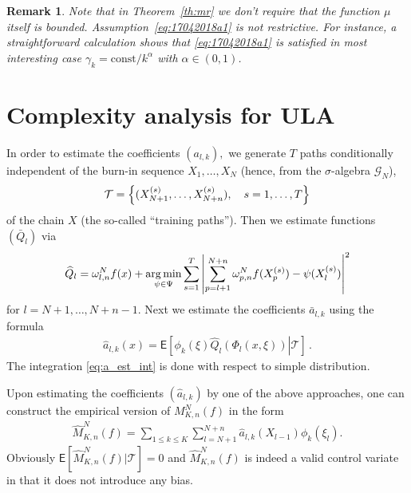 \documentclass[aap,preprint]{imsart}
\def\NtrainPath{T}
\def\TrainSet{\mathcal{T}}
\newtheorem{remark}{Remark}
\newcommand*{\argmin}{\operatornamewithlimits{arg\,min}}
\newcommand*{\const}{\mathrm{const}}
\begin{document}
\begin{remark}
Note that in  Theorem~\eqref{th:mr} we don't require that  the function \(\mu\) itself is bounded.
Assumption~\eqref{eq:17042018a1} is not restrictive.
For instance, a straightforward calculation shows
that \eqref{eq:17042018a1} is satisfied in most interesting case
$\gamma_k=\const/k^\alpha$ with $\alpha\in (0,1)$.
\end{remark}
\section{Complexity analysis for ULA}
\label{sec:coeff}
In order to estimate the coefficients \((a_{l,k}),\) we generate \(\NtrainPath\)  paths conditionally independent of the burn-in sequence $X_1,\dots,X_N$ (hence, from the $\sigma$-algebra $\mathcal{G}_N$),
\[
\TrainSet=\Bigl\{(X^{(s)}_{N+1},\ldots,X^{(s)}_{N+n}),\quad s=1,\ldots,\NtrainPath\Bigr\}
\]
of the chain \(X\)
(the so-called ``training paths'').
Then we estimate  functions \((\bar Q_{l})\) via
\begin{equation}\label{eq:06042018a1}
{\widehat  Q}_{l}=\omega_{l,n}^{N}f(x)+\argmin_{\psi\in \Psi}\sum_{s=1}^{\NtrainPath} \left | \sum_{p=l+1}^{N+n}\omega_{p,n}^{N}f(X^{(s)}_{p})-\psi(X^{(s)}_{l})\right|^2
\end{equation}
for \(l=N+1,\ldots, N+n-1.\)
Next  we estimate the coefficients \( \bar a_{l,k}\) using
the formula
\begin{eqnarray}
\label{eq:a_est_int}
\widehat a_{l,k}(x)=\mathsf{E}\left[\left.\phi_k\left(\xi\right)\widehat Q_{l}\left(\Phi_l(x,\xi)\right)\right | \TrainSet\right] \,.
\end{eqnarray}
The integration \eqref{eq:a_est_int} is done with respect to simple distribution.
\par
Upon estimating  the coefficients \((\widehat a_{l,k})\) by one of the above approaches, one can construct the empirical version of \(M_{K,n}^N(f)\) in the form
\begin{eqnarray*}
\widehat M_{K,n}^N(f) =\sum_{1\leq  k \le K}\sum_{l=N+1}^{N+n}\widehat a_{l,k}(X_{l-1})\phi_k(\xi_{l}).
\end{eqnarray*}
Obviously \(\mathsf{E}[\widehat M_{K,n}^N(f)|\TrainSet]=0\) and \(\widehat M_{K,n}^N(f)\) is indeed a valid control variate in that it
does not introduce any bias.
\end{document}
